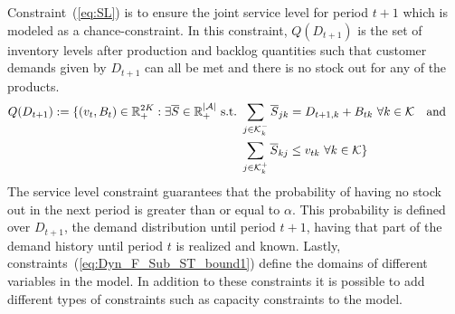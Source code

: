 \documentclass[11pt]{article}
\newcommand{\ti}{t} %
\newcommand{\ka}{k} %
\newcommand{\KA}{\mathcal{K}}
\newcommand{\Ka}{K}
\newcommand{\jey}{j} %
\newcommand{\Graf}{\mathcal{A}} %
\newcommand{\Bi}{B} %
\newcommand{\Vi}{v} %
\newcommand{\Es}{S} %
\newcommand{\Csub}{\mathcal{K}^+_k}
\newcommand{\Psub}{\mathcal{K}^-_k}
\begin{document}
Constraint~(\ref{eq:SL}) is to ensure the joint service level for period $\ti+1$ which is modeled as a chance-constraint. In this constraint, $Q(D_ {\ti+1})$ is the set of inventory levels after production and backlog quantities such that customer demands given by $D_{\ti+1}$ can all be met and there is no stock out for any of the products.
\begin{align} Q(D_ {\ti +1}) := \{ (v_{\ti},B_{\ti}) \in \mathbb{R}_{+}^{2\Ka} :  \exists \overline{\Es} \in \mathbb{R}_{+}^{|\Graf|} \ \text{s.t.} \ 
 & \sum_{\jey \in  \Psub} \overline{\Es}_{\jey \ka } = D_{\ti+1,\ka} + \Bi_{\ti\ka} \ \forall \ka  \in \KA  \quad \text{and }\notag \\
 & \sum_{\jey \in  \Csub} \overline{\Es}_{\ka \jey} \leq \Vi_{\ti\ka} \ \forall \ka  \in \KA \} & \label{eq:SetQ}
 \end{align}
  The service level constraint guarantees that the probability of having no stock out in the next period is greater than or equal to $\alpha$. 
 This probability is defined over $D_{\ti+1}$, the demand distribution until period $\ti+1$, having that part of the demand history until period $\ti$ is realized and known. Lastly, constraints~(\ref{eq:Dyn_F_Sub_ST_bound1}) define the domains of different variables in the model.
In addition to these constraints it is possible to add different types of constraints such as capacity constraints to the model.
\end{document}
